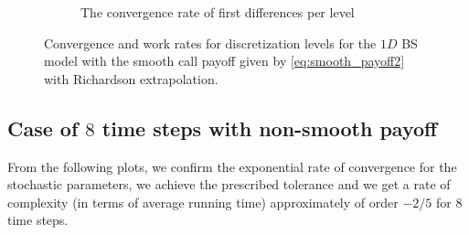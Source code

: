 \documentclass[11pt]{article}
\begin{document}
\begin{figure}[!h]
\begin{subfigure}{.5\textwidth}
		\caption{ The convergence rate of first differences per level}
		\label{fig:misc_1D_BS_2_4_steps_smooth_second_payoff_eps_10_5_sub4}
	\end{subfigure}%
	\caption{Convergence and work rates for discretization levels for the $1D$ BS model with the smooth call payoff given by \eqref{eq:smooth_payoff2} with Richardson extrapolation.}
	\label{fig:misc_1D_BS_2_4_steps_smooth_second_payoff_eps_10_5_2}
\end{figure}
\newpage


\subsection{Case of $8$ time steps with non-smooth payoff}

From the following plots, we confirm the exponential rate of convergence for the stochastic parameters, we achieve the prescribed tolerance and  we get a rate of complexity (in terms of average running time) approximately of order $-2/5$ for $8$ time steps.
\end{document}
